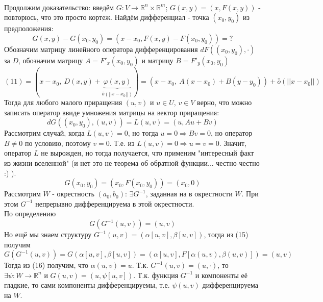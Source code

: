 \documentclass[book, 11pt]{report}
\begin{document}
    \vspace{0.5cm}
\par
\noindent\hrulefill\noindent
\par{\ }
\par{Продолжим доказательство: введём $G:V\to\mathbb{R}^n\times\mathbb{R}^m$; $G(x,y)=(x,F(x,y))$ - повторюсь, что это просто кортеж. Найдём дифференциал - точка $(x_0,y_0)$ из предположения:
\begin{equation}
    G(x,y)-G(x_0,y_0)=(x-x_0,F(x,y)-F(x_0,y_0))=?
\end{equation}
Обозначим матрицу линейного оператора дифференцирования $dF((x_0,y_0),\cdot)$ за $D$, обозначим матрицу $A=F'_x(x_0,y_0)$ и матрицу $B=F'_y(x_0,y_0)$
\begin{equation}
    (11)=(x-x_0, \ D(x,y)+\underbrace{\varphi(x,y)}_{\bar{\bar{o}}(||x-x_0||)})=(x-x_0, \ A(x-x_0)+B(y-y_0))+\bar{\bar{o}}(||x-x_0||)
\end{equation}
Тогда для любого малого приращения $(u,v)$ и $u\in U$, $v\in V$ верно, что можно записать оператор ввиде умножения матрицы на вектор приращения:
\begin{equation}
    dG((x_0,y_0),(u,v))=L(u,v)=(u,Au+Bv)
\end{equation}
Рассмотрим случай, когда $L(u,v)=0$, но тогда $u=0\Rightarrow Bv=0$, но оператор $B\ne0$ по условию, поэтому $v=0$. Т.е. из $L(u,v)=0\Rightarrow u=v=0$. Значит, оператор $L$ не вырожден, но тогда получается, что применим "интересный факт из жизни вселенной" (и нет это не теорема об обратной функции... честно-честно :) ). 
\begin{equation}
    G(x_0,y_0)=(x_0,F(x_0,y_0))=(x_0,0)
\end{equation}
Рассмотрим $W$ - окрестность $(a_0,b_0)$: $\exists G^{-1}$, заданная на в окрестности $W$. При этом $G^{-1}$ непрерывно дифференцируема в этой окрестности. \\
По определению
\begin{equation}
    G(G^{-1}(u,v))=(u,v)
\end{equation}
Но ещё мы знаем структуру $G^{-1}(u,v)=(\alpha[u,v],\beta[u,v])$, тогда из (15) получим
\begin{equation}
    G(G^{-1}(u,v))=G(\alpha[u,v],\beta[u,v])=(\alpha[u,v],F[\alpha(u,v),\beta(u,v)])=(u,v)
\end{equation}
Тогда из (16) получим, что $\alpha(u,v)=u$. Т.к. $G^{-1}(u,v)=(u,\cdot)$, то $\exists\psi:W\to\mathbb{R}^n$ и $G(u,v)=(u,\psi[u,v])$. Т.к. функция $G^{-1}$ и компоненты её гладкие, то сами компоненты дифференцируемы, т.е. $\psi(u,v)$ дифференцируема на $W$.\\
}
\end{document}
